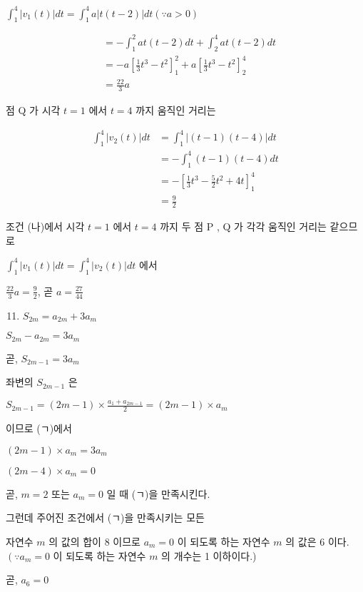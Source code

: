 \documentclass[10pt]{article}
\begin{document}
$\int_{1}^{4}\left|v_{1}(t)\right| d t=\int_{1}^{4} a|t(t-2)| d t(\because a>0)$

\[
\begin{aligned}
& =-\int_{1}^{2} a t(t-2) d t+\int_{2}^{4} a t(t-2) d t \\
& =-a\left[\frac{1}{3} t^{3}-t^{2}\right]_{1}^{2}+a\left[\frac{1}{3} t^{3}-t^{2}\right]_{2}^{4} \\
& =\frac{22}{3} a
\end{aligned}
\]

점 Q 가 시각 $t=1$ 에서 $t=4$ 까지 움직인 거리는

\[
\begin{aligned}
\int_{1}^{4}\left|v_{2}(t)\right| d t & =\int_{1}^{4}|(t-1)(t-4)| d t \\
& =-\int_{1}^{4}(t-1)(t-4) d t \\
& =-\left[\frac{1}{3} t^{3}-\frac{5}{2} t^{2}+4 t\right]_{1}^{4} \\
& =\frac{9}{2}
\end{aligned}
\]

조건 (나)에서 시각 $t=1$ 에서 $t=4$ 까지 두 점 P , Q 가 각각 움직인 거리는 같으므로

$\int_{1}^{4}\left|v_{1}(t)\right| d t=\int_{1}^{4}\left|v_{2}(t)\right| d t$ 에서

$\frac{22}{3} a=\frac{9}{2}$, 곧 $a=\frac{27}{44}$

\begin{enumerate}
  \setcounter{enumi}{10}
  \item $S_{2 m}=a_{2 m}+3 a_{m}$
\end{enumerate}

$S_{2 m}-a_{2 m}=3 a_{m}$

곧, $S_{2 m-1}=3 a_{m}$

좌변의 $S_{2 m-1}$ 은

$S_{2 m-1}=(2 m-1) \times \frac{a_{1}+a_{2 m-1}}{2}=(2 m-1) \times a_{m}$

이므로 (ㄱ)에서

$(2 m-1) \times a_{m}=3 a_{m}$

$(2 m-4) \times a_{m}=0$

곧, $m=2$ 또는 $a_{m}=0$ 일 때 (ㄱ)을 만족시킨다.

그런데 주어진 조건에서 (ㄱ)을 만족시키는 모든

자연수 $m$ 의 값의 합이 8 이므로 $a_{m}=0$ 이 되도록 하는 자연수 $m$ 의 값은 6 이다. $\left(\because a_{m}=0\right.$ 이 되도록 하는 자연수 $m$ 의 개수는 1 이하이다.)

곧, $a_{6}=0$
\end{document}
